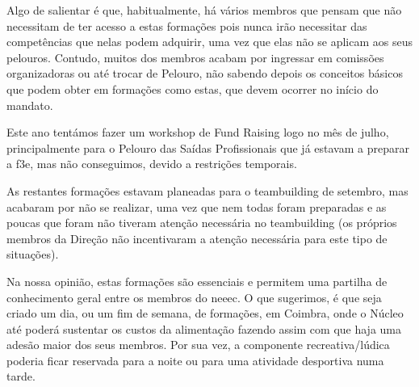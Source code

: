 Algo de salientar é que, habitualmente, há vários membros que pensam que não necessitam de ter acesso a estas formações pois nunca irão necessitar das competências que nelas podem adquirir, uma vez que elas não se aplicam aos seus pelouros. Contudo, muitos dos membros acabam por ingressar em comissões organizadoras ou até trocar de Pelouro, não sabendo depois os conceitos básicos que podem obter em formações como estas, que devem ocorrer no início do mandato.

Este ano tentámos fazer um workshop de Fund Raising logo no mês de julho, principalmente para o Pelouro das Saídas Profissionais que já estavam a preparar a \acrshort{f3e}, mas não conseguimos, devido a restrições temporais.

As restantes formações estavam planeadas para o teambuilding de setembro, mas acabaram por não se realizar, uma vez que nem todas foram preparadas e as poucas que foram não tiveram atenção necessária no teambuilding (os próprios membros da Direção não incentivaram a atenção necessária para este tipo de situações).

Na nossa opinião, estas formações são essenciais e permitem uma partilha de conhecimento geral entre os membros do \acrshort{neeec}. O que sugerimos, é que seja criado um dia, ou um fim de semana, de formações, em Coimbra, onde o Núcleo até poderá sustentar os custos da alimentação fazendo assim com que haja uma adesão maior dos seus membros. Por sua vez, a componente recreativa/lúdica poderia ficar reservada para a noite ou para uma atividade desportiva numa tarde.